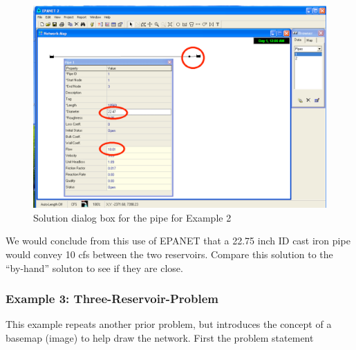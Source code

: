 \begin{figure}[htbp] %
   \centering
   \includegraphics[width=6in]{new-solution.pdf} 
   \caption{Solution dialog box for the pipe for Example 2}
   \label{fig:new-solution}
\end{figure}

We would conclude from this use of EPANET that a 22.75 inch ID cast iron pipe would convey 10 cfs between the two reservoirs.  Compare this solution to the ``by-hand'' soluton to see if they are close.
\clearpage
\subsubsection{Example 3: Three-Reservoir-Problem}
This example repeats another prior problem, but introduces the concept of a basemap (image) to help draw the network.  First the problem statement

